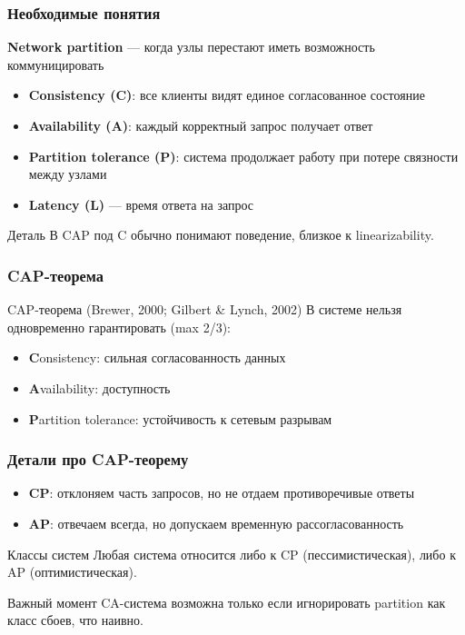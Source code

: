 \documentclass{beamer}
\begin{document}
\begin{frame}
\frametitle{Необходимые понятия}

\textbf{Network partition} --- когда узлы перестают иметь возможность коммуницировать \\

\begin{itemize}
  \item \textbf{Consistency (C)}: все клиенты видят единое согласованное состояние
  \item \textbf{Availability (A)}: каждый корректный запрос получает ответ
  \item \textbf{Partition tolerance (P)}: система продолжает работу при потере связности между узлами
  \item \textbf{Latency (L)} --- время ответа на запрос
\end{itemize}

\begin{block}{Деталь}
В CAP под C обычно понимают поведение, близкое к linearizability.
\end{block}

\end{frame}

\begin{frame}
\frametitle{CAP-теорема}

\begin{block}{CAP-теорема (Brewer, 2000; Gilbert \& Lynch, 2002)}
В системе нельзя одновременно гарантировать (max 2/3):
\begin{itemize}
  \item \textbf{C}onsistency: сильная согласованность данных
  \item \textbf{A}vailability: доступность
  \item \textbf{P}artition tolerance: устойчивость к сетевым разрывам
\end{itemize}
\end{block}


\end{frame}

\begin{frame}
\frametitle{Детали про CAP-теорему}

\begin{itemize}
  \item \textbf{CP}: отклоняем часть запросов, но не отдаем противоречивые ответы
  \item \textbf{AP}: отвечаем всегда, но допускаем временную рассогласованность
\end{itemize}

\begin{block}{Классы систем}
Любая система относится либо к CP (пессимистическая), либо к AP (оптимистическая).
\end{block}

\begin{alertblock}{Важный момент}
CA-система возможна только если игнорировать partition как класс сбоев, что наивно.
\end{alertblock}

\end{frame}
\end{document}
